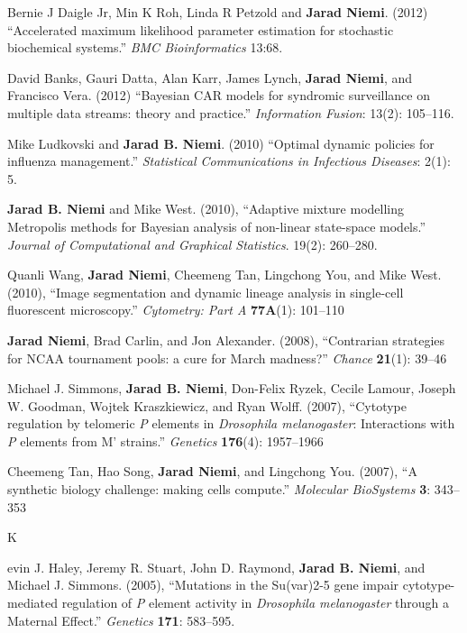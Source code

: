 \documentclass[overlapped,line]{res}
\begin{document}
\begin{resume}
Bernie J Daigle Jr, Min K Roh, Linda R Petzold and {\bf Jarad Niemi}. (2012) ``Accelerated maximum likelihood parameter estimation for stochastic biochemical systems.'' \emph{BMC Bioinformatics} 13:68.

David Banks, Gauri Datta, Alan Karr, James Lynch, {\bf Jarad Niemi}, and Francisco Vera. (2012) ``Bayesian CAR models for syndromic surveillance on multiple data streams: theory and practice.'' \emph{Information Fusion}: 13(2): 105--116.

Mike Ludkovski and {\bf Jarad B. Niemi}. (2010) ``Optimal dynamic policies for influenza management.'' \emph{Statistical Communications in Infectious Diseases}: 2(1): 5.

{\bf Jarad B. Niemi} and Mike West. (2010), ``Adaptive mixture modelling Metropolis methods for Bayesian analysis of non-linear state-space models.'' \emph{Journal of Computational and Graphical Statistics}. 19(2): 260--280.

Quanli Wang, {\bf Jarad Niemi}, Cheemeng Tan, Lingchong You, and Mike West. (2010), ``Image segmentation and dynamic lineage analysis in single-cell fluorescent microscopy.'' \emph{Cytometry: Part A} {\bf 77A}(1): 101--110

{\bf Jarad Niemi}, Brad Carlin, and Jon Alexander. (2008), ``Contrarian strategies for NCAA tournament pools: a cure for March madness?'' \emph{Chance} {\bf 21}(1): 39--46


Michael J. Simmons, {\bf Jarad B. Niemi}, Don-Felix Ryzek, Cecile Lamour, Joseph W. Goodman, Wojtek Kraszkiewicz, and Ryan Wolff. (2007), ``Cytotype regulation by telomeric \emph{P} elements in \emph{Drosophila melanogaster}: Interactions with \emph{P} elements from M' strains.'' \emph{Genetics} {\bf 176}(4): 1957--1966

Cheemeng Tan, Hao Song, {\bf Jarad Niemi}, and Lingchong You. (2007), ``A synthetic biology challenge: making cells compute.'' \emph{Molecular BioSystems}  {\bf 3}: 343--353

\newpage \opening

Kevin J. Haley, Jeremy R. Stuart, John D. Raymond, {\bf Jarad B. Niemi}, and Michael J. Simmons. (2005), ``Mutations in the Su(var)2-5 gene impair cytotype-mediated regulation of \emph{P} element activity in \emph{Drosophila melanogaster} through a Maternal Effect.'' \emph{Genetics} {\bf 171}: 583--595.





\end{resume}
\end{document}
